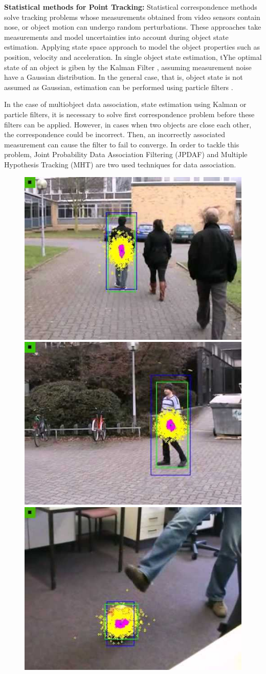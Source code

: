 \textbf{Statistical methods for Point Tracking: } Statistical correspondence methods solve tracking problems whose measurements obtained from video sensors contain nose, or object motion can undergo random perturbations. These approaches take measurements and model uncertainties into account during object state estimation. Applying state space approach to model the object properties such as position, velocity and acceleration. In single object state estimation, tYhe optimal state of an object is giben by the Kalman Filter \cite{Ren2008a,Heikkila2004}, assuming measurement noise have a Gaussian distribution. In the general case, that is, object state is not assumed as Gaussian, estimation can be performed using particle filters \cite{Okuma2004,Rittscher2000}.

In the case of multiobject data association, state estimation using Kalman or particle filters, it is necessary to solve first correspondence problem before these filters can be applied. However, in cases when two objects are close each other, the correspondence could be incorrect. Then, an incorrectly associated measurement can cause the filter to fail to converge. In order to tackle this problem, Joint Probability Data Association Filtering (JPDAF) \cite{Schulz2003} and Multiple Hypothesis Tracking (MHT) \cite{Zulkifley2012} are two used techniques for data association.

\begin{figure}[t!!]
\centering
{
\includegraphics[width=0.32\linewidth]{Figures/particle_filter1.jpg}
\includegraphics[width=0.32\linewidth]{Figures/particle_filter2.jpg}
\includegraphics[width=0.32\linewidth]{Figures/particle_filter3.jpg}
}
\caption{\cite{Rittscher2000}}
\end{figure}


